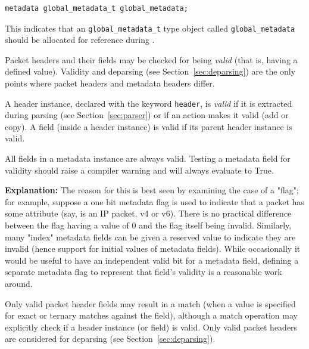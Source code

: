 \documentclass[12pt]{article}
\begin{document}
\begin{lstlisting}[style=P4style]
metadata global_metadata_t global_metadata;
\end{lstlisting}

This indicates that an \texttt{global_metadata_t} type object called
\texttt{global_metadata} should be allocated for reference during
\matchaction.  


Packet headers and their fields may be checked for being
\textit{valid} (that is, having a defined value). Validity and
deparsing (see Section~\ref{sec:deparsing}) are the only points where packet
headers and metadata headers differ.

A header instance, declared with the keyword \texttt{header}, is \textit{valid}
if it is extracted during parsing (see Section~\ref{sec:parser}) or if an action
makes it valid (add or copy). A field (inside a header instance) is valid if its
parent header instance is valid.

All fields in a metadata instance are always valid.  Testing a
metadata field for validity should raise a compiler warning and will
always evaluate to True.

\begin{adjustwidth}{1.5cm}{1.5cm}
\textbf{Explanation: } The reason for this is best seen by examining
the case of a "flag"; for example, suppose a one bit metadata flag is
used to indicate that a packet has some attribute (say, is an IP
packet, v4 or v6).  There is no practical difference between the flag
having a value of 0 and the flag itself being invalid.  Similarly,
many "index" metadata fields can be given a reserved value to indicate
they are invalid (hence support for initial values of metadata
fields).  While occasionally it would be useful to have an independent
valid bit for a metadata field, defining a separate metadata flag to
represent that field's validity is a reasonable work around.
\end{adjustwidth}

Only valid packet header fields may result in a match (when a value is
specified for exact or ternary matches against the field), although a
match operation may explicitly check if a header instance (or field)
is valid. Only valid packet headers are considered for deparsing (see
Section~\ref{sec:deparsing}).  

\end{document}

